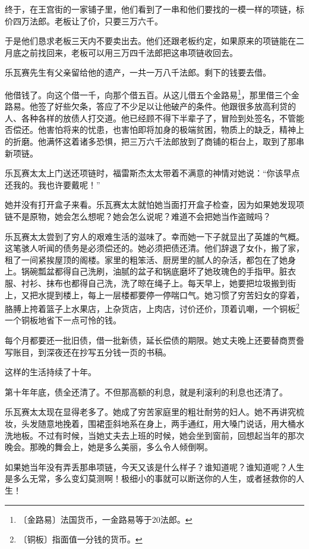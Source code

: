 \documentclass[12pt,UTF-8,openany]{ctexbook}
\begin{document}
\begin{normalsize}
    终于，在王宫街的一家铺子里，他们看到了一串和他们要找的一模一样的项链，标价四万法郎。老板让了价，只要三万六千。
    
    于是他们恳求老板三天内不要卖出去。他们还跟老板约定，如果原来的项链能在二月底之前找回来，老板可以用三万四千法郎把这串项链收回去。
    
    乐瓦赛先生有父亲留给他的遗产，一共一万八千法郎。剩下的钱要去借。
    
    他借钱了。向这个借一千，向那个借五百。从这儿借五个金路易\footnote{〔金路易〕法国货币，一金路易等于20法郎。}，那里借三个金路易。他签了好些欠条，答应了不少足以让他破产的条件。他跟很多放高利贷的人、各种各样的放债人打交道。他已经顾不得下半辈子了，冒险到处签名，不管能否偿还。他害怕将来的忧患，也害怕即将加身的极端贫困，物质上的缺乏，精神上的折磨。他满怀这着诸多恐惧，把三万六千法郎放到了商铺的柜台上，取到了那串新项链。
    
    乐瓦赛太太上门送还项链时，福雷斯杰太太带着不满意的神情对她说：“你该早点还我的。我也许要戴呢！”
    
    她并没有打开盒子来看。乐瓦赛太太就怕她当面打开盒子检查，因为如果她发现项链不是原物，她会怎么想呢？她会怎么说呢？难道不会把她当作盗贼吗？
    
    乐瓦赛太太尝到了穷人的艰难生活的滋味了。幸而她一下子就显出了英雄的气概。这笔骇人听闻的债务是必须偿还的。她必须把债还清。他们辞退了女仆，搬了家，租了一间紧挨屋顶的阁楼。家里的粗笨活、厨房里的腻人的杂活，都包在了她身上。锅碗瓢盆都得自己洗刷，油腻的盆子和锅底磨坏了她玫瑰色的手指甲。脏衣服、衬衫、抹布也都得自己洗，洗了晾在绳子上。每天早上，她要把垃圾搬到街上，又把水提到楼上，每上一层楼都要停一停喘口气。她习惯了穷苦妇女的穿着，胳膊上挎着篮子上水果店，上杂货店，上肉店，讨价还价，顶着讥嘲，一个铜板\footnote{〔铜板〕指面值一分钱的货币。}一个铜板地省下一点可怜的钱。
    
    每个月都要还一批旧债，借一批新债，延长偿债的期限。她丈夫晚上还要替商贾誊写账目，到深夜还在抄写五分钱一页的书稿。
    
    这样的生活持续了十年。
    
    第十年年底，债全还清了。不但那高额的利息，就是利滚利的利息也还清了。
    
    乐瓦赛太太现在显得老多了。她成了穷苦家庭里的粗壮耐劳的妇人。她不再讲究梳妆，头发随意地挽着，围裙歪斜地系在身上，两手通红，用大嗓门说话，用大桶水洗地板。不过有时候，当她丈夫去上班的时候，她会坐到窗前，回想起当年的那次晚会。那晚的舞会上，她是多么美丽，多么令人倾倒啊。
    
    如果她当年没有弄丢那串项链，今天又该是什么样子？谁知道呢？谁知道呢？人生是多么无常，多么变幻莫测啊！极细小的事就可以断送你的人生，或者拯救你的人生！
    

\end{normalsize}
\end{document}
